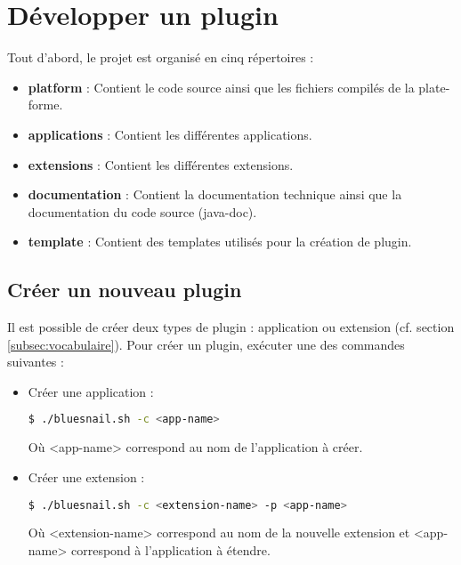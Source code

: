 \section{Développer un plugin}

    \noindent Tout d'abord, le projet est organisé en cinq répertoires :
    \begin{itemize}
        \item \textbf{platform} : Contient le code source ainsi que les fichiers compilés de la plate-forme.
        
        \item \textbf{applications} : Contient les différentes applications.
        
        \item \textbf{extensions} : Contient les différentes extensions.
        
        \item \textbf{documentation} : Contient la documentation technique ainsi que la documentation du code source (java-doc).
        
        \item \textbf{template} : Contient des templates utilisés pour la création de plugin.
    \end{itemize}

\subsection{Créer un nouveau plugin}
\label{subsec:creation_plugin}

    Il est possible de créer deux types de plugin : application ou extension (cf. section \ref{subsec:vocabulaire}). Pour créer un plugin, exécuter une des commandes suivantes :
    
    \begin{itemize}
        \item Créer une application :
        \begin{lstlisting}[language=bash]
        $ ./bluesnail.sh -c <app-name>
        \end{lstlisting}
        Où <app-name> correspond au nom de l'application à créer.
        
        \item Créer une extension :
        \begin{lstlisting}[language=bash]
        $ ./bluesnail.sh -c <extension-name> -p <app-name>
        \end{lstlisting}
        Où <extension-name> correspond au nom de la nouvelle extension et <app-name> correspond à l'application à étendre.
    \end{itemize}
    
